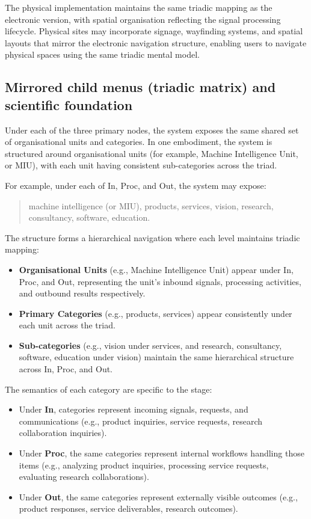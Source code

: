 \documentclass[11pt,a4paper]{article}
\begin{document}
The physical implementation maintains the same triadic mapping as the electronic version, with spatial organisation reflecting the signal processing lifecycle. Physical sites may incorporate signage, wayfinding systems, and spatial layouts that mirror the electronic navigation structure, enabling users to navigate physical spaces using the same triadic mental model.

\subsection*{Mirrored child menus (triadic matrix) and scientific foundation}

Under each of the three primary nodes, the system exposes the same shared set of organisational units and categories. In one embodiment, the system is structured around organisational units (for example, Machine Intelligence Unit, or MIU), with each unit having consistent sub-categories across the triad.

For example, under each of In, Proc, and Out, the system may expose:
\begin{quote}
machine intelligence (or MIU), products, services, vision, research, consultancy, software, education.
\end{quote}

The structure forms a hierarchical navigation where each level maintains triadic mapping:
\begin{itemize}[noitemsep]
  \item \textbf{Organisational Units} (e.g., Machine Intelligence Unit) appear under In, Proc, and Out, representing the unit's inbound signals, processing activities, and outbound results respectively.
  \item \textbf{Primary Categories} (e.g., products, services) appear consistently under each unit across the triad.
  \item \textbf{Sub-categories} (e.g., vision under services, and research, consultancy, software, education under vision) maintain the same hierarchical structure across In, Proc, and Out.
\end{itemize}

The semantics of each category are specific to the stage:
\begin{itemize}[noitemsep]
  \item Under \textbf{In}, categories represent incoming signals, requests, and communications (e.g., product inquiries, service requests, research collaboration inquiries).
  \item Under \textbf{Proc}, the same categories represent internal workflows handling those items (e.g., analyzing product inquiries, processing service requests, evaluating research collaborations).
  \item Under \textbf{Out}, the same categories represent externally visible outcomes (e.g., product responses, service deliverables, research outcomes).
\end{itemize}
\end{document}
